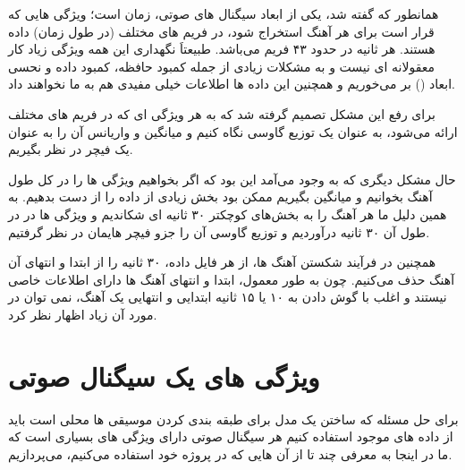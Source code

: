 \documentclass[12pt,onecolumn,a4paper]{article}
\begin{document}
همانطور که گفته شد، یکی از ابعاد سیگنال های صوتی، زمان است؛ ویژگی هایی که قرار است برای هر آهنگ استخراج شود، در فریم های مختلف (در طول زمان) داده هستند.
هر ثانیه در حدود ۴۳ فریم می‌باشد. طبیعتاَ نگهداری این همه ویژگی زیاد کار معقولانه ای نیست و به مشکلات زیادی از جمله کمبود حافظه، کمبود داده و نحسی ابعاد () بر می‌خوریم و همچنین این داده ها اطلاعات خیلی مفیدی هم به ما نخواهند داد.

برای رفع این مشکل تصمیم گرفته شد که  به هر ویژگی ای که در فریم های مختلف ارائه می‌شود، به عنوان یک توزیع
گاوسی نگاه کنیم و میانگین و واریانس آن را به عنوان یک فیچر در نظر بگیریم.

حال مشکل دیگری که به وجود می‌آمد این بود که اگر بخواهیم ویژگی ها را در کل طول آهنگ بخوانیم و میانگین بگیریم ممکن بود بخش زیادی از داده را از دست بدهیم. به همین دلیل ما هر آهنگ را به بخش‌های کوچکتر ۳۰ ثانیه ای شکاندیم و ویژگی ها در در طول آن ۳۰ ثانیه درآوردیم و توزیع گاوسی آن را جزو فیچر هایمان در نظر گرفتیم. 

همچنین در فرآیند شکستن آهنگ ها، از هر فایل داده، ۳۰ ثانیه را از ابتدا و انتهای آن آهنگ حذف می‌کنیم. چون به طور معمول، ابتدا و انتهای آهنگ ها دارای اطلاعات خاصی نیستند و اغلب با گوش دادن به ۱۰ یا ۱۵ ثانیه ابتدایی و انتهایی یک آهنگ، نمی توان در مورد آن زیاد اظهار نظر کرد.


\section{ویژگی های یک سیگنال صوتی}
برای حل مسئله که ساختن یک مدل برای طبقه بندی کردن موسیقی ها محلی است باید از داده های موجود استفاده کنیم هر سیگنال صوتی دارای ویژگی های بسیاری است که ما در اینجا به معرفی چند تا از آن هایی که در پروژه خود استفاده می‌کنیم، می‌پردازیم.
\end{document}
